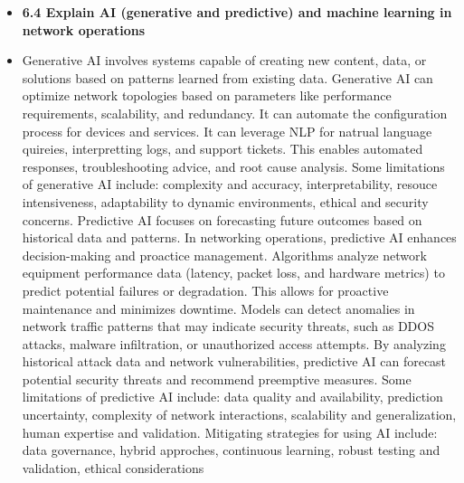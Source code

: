 \documentclass{article}
\begin{document}
\begin{itemize}
  \item \textbf{6.4 Explain AI (generative and predictive) and machine learning in network operations}
  	\item[] Generative AI involves systems capable of creating new content, data, or solutions based on patterns learned from existing data. Generative AI can optimize network topologies based on parameters like performance requirements, scalability, and redundancy. It can automate the configuration process for devices and services. It can leverage NLP for natrual language quireies, interpretting logs, and support tickets. This enables automated responses, troubleshooting advice, and root cause analysis. Some limitations of generative AI include: complexity and accuracy, interpretability, resouce intensiveness, adaptability to dynamic environments, ethical and security concerns. Predictive AI focuses on forecasting future outcomes based on historical data and patterns. In networking operations, predictive AI enhances decision-making and proactice management. Algorithms analyze network equipment performance data (latency, packet loss, and hardware metrics) to predict potential failures or degradation. This allows for proactive maintenance and minimizes downtime. Models can detect anomalies in network traffic patterns that may indicate security threats, such as DDOS attacks, malware infiltration, or unauthorized access attempts. By analyzing historical attack data and network vulnerabilities, predictive AI can forecast potential security threats and recommend preemptive measures. Some limitations of predictive AI include: data quality and availability, prediction uncertainty, complexity of network interactions, scalability and generalization, human expertise and validation. Mitigating strategies for using AI include: data governance, hybrid approches, continuous learning, robust testing and validation, ethical considerations
	

\end{itemize}
\end{document}
